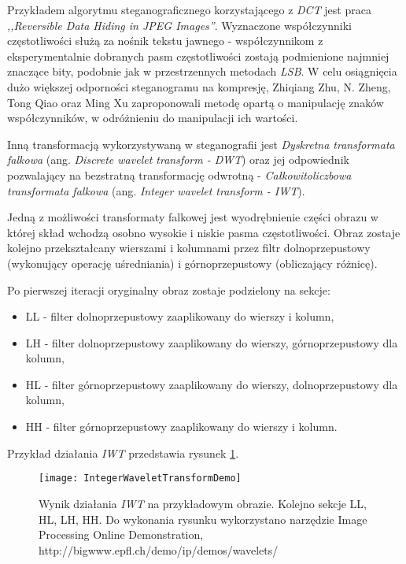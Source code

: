 {{{            %
            Przykładem algorytmu steganograficznego korzystającego z \textit{DCT} jest praca \textit{,,Reversible Data
            Hiding in JPEG Images''}\cite{Huang2016ReversibleDH, Li2007ASM}. Wyznaczone współczynniki częstotliwości
            służą za nośnik tekstu jawnego - współczynnikom z eksperymentalnie dobranych pasm częstotliwości zostają
            podmienione najmniej znaczące bity, podobnie jak w przestrzennych metodach \textit{LSB}. W celu osiągnięcia
            dużo większej odporności steganogramu na kompresję, Zhiqiang Zhu, N. Zheng, Tong Qiao oraz Ming Xu
            zaproponowali metodę opartą o manipulację znaków współczynników, w odróżnieniu do manipulacji ich
            wartości\cite{Zhu2019RobustSB}.

            Inną transformacją wykorzystywaną w steganografii jest \textit{Dyskretna transformata falkowa} (ang.
            \textit{Discrete wavelet transform - DWT}) oraz jej odpowiednik pozwalający na bezstratną transformację
            odwrotną - \textit{Całkowitoliczbowa transformata falkowa} (ang. \textit{Integer wavelet transform -
            IWT})\cite{Xuan2005LosslessDH}.

            Jedną z możliwości transformaty falkowej jest wyodrębnienie części obrazu w której skład wchodzą osobno
            wysokie i niskie pasma częstotliwości. Obraz zostaje kolejno przekształcany wierszami i kolumnami przez
            filtr dolnoprzepustowy (wykonujący operację uśredniania) i górnoprzepustowy (obliczający różnicę).

            Po pierwszej iteracji oryginalny obraz zostaje podzielony na sekcje:
            \begin{itemize}
                \item LL - filter dolnoprzepustowy zaaplikowany do wierszy i kolumn,
                \item LH - filter dolnoprzepustowy zaaplikowany do wierszy, górnoprzepustowy dla kolumn,
                \item HL - filter górnoprzepustowy zaaplikowany do wierszy, dolnoprzepustowy dla kolumn,
                \item HH - filter górnoprzepustowy zaaplikowany do wierszy i kolumn.
            \end{itemize}

            Przykład działania \textit{IWT} przedstawia rysunek \ref{fig:iwtdemo}.

            \begin{figure}
                \centering
                \texttt{[image: IntegerWaveletTransformDemo]}
                \caption{Wynik działania \textit{IWT} na przykładowym obrazie. Kolejno sekcje LL, HL, LH, HH. Do wykonania
                    rysunku wykorzystano narzędzie Image Processing Online Demonstration,
                    http://bigwww.epfl.ch/demo/ip/demos/wavelets/}
                \label{fig:iwtdemo}
            \end{figure}


}}}
